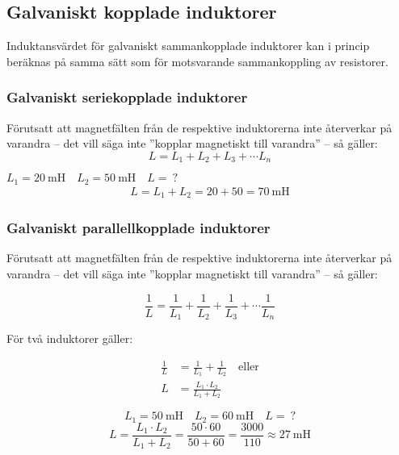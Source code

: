 \subsection{Galvaniskt kopplade induktorer}
\label{galvaniskt_kopplade_induktorer}

Induktansvärdet för galvaniskt sammankopplade induktorer kan i princip
beräknas på samma sätt som för motsvarande sammankoppling av resistorer.

\subsubsection{Galvaniskt seriekopplade induktorer}

Förutsatt att magnetfälten från de respektive induktorerna inte återverkar på
varandra -- det vill säga inte ''kopplar magnetiskt till varandra'' -- så
gäller:
%
\[L = L_1 + L_2 + L_3 + \cdots L_n\]
%
\newpage
\begin{exempelbox}
\(L_1 = \qty{20}{\milli\henry} \quad L_2 = \qty{50}{\milli\henry} \quad L =\ ?\)
\tcblower
\begin{align*}
  L = L_1 + L_2 = 20 + 50 = \qty{70}{\milli\henry}
\end{align*}
\end{exempelbox}

\subsubsection{Galvaniskt parallellkopplade induktorer}

Förutsatt att magnetfälten från de respektive induktorerna inte återverkar på
varandra -- det vill säga inte ''kopplar magnetiskt till varandra'' -- så
gäller:

\[
\frac{1}{L} = \frac{1}{L_1} + \frac{1}{L_2} + \frac{1}{L_3} +
\cdots \frac{1}{L_n}
\]

För två induktorer gäller:

\begin{align*}
  \frac{1}{L} &= \frac{1}{L_1} + \frac{1}{L_2} \quad \text{eller} \\
  L &= \frac{L_1 \cdot L_2}{L_1 + L_2}
\end{align*}

\begin{exempelbox}
\[L_1 = \qty{50}{\milli\henry} \quad L_2 = \qty{60}{\milli\henry} \quad L =\ ?\]
\tcblower
\[
  L = \frac{L_1 \cdot L_2}{L_1 + L_2}
  = \frac{50 \cdot 60}{50 + 60}
  = \frac{3000}{110}
  \approx \qty{27}{\milli\henry}
\]
\end{exempelbox}

